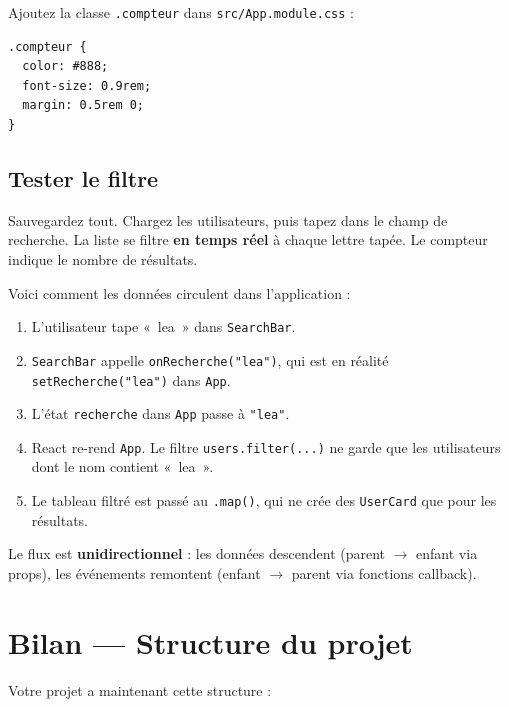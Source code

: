 \documentclass[11pt,a4paper]{article}
\begin{document}
Ajoutez la classe \texttt{.compteur} dans \texttt{src/App.module.css} :

\begin{lstlisting}[style=css]
.compteur {
  color: #888;
  font-size: 0.9rem;
  margin: 0.5rem 0;
}
\end{lstlisting}

\subsection{Tester le filtre}

Sauvegardez tout. Chargez les utilisateurs, puis tapez dans le champ de recherche. La liste se filtre \textbf{en temps réel} à chaque lettre tapée. Le compteur indique le nombre de résultats.

\begin{retenirbox}
Voici comment les données circulent dans l'application :

\begin{enumerate}[nosep]
    \item L'utilisateur tape «~lea~» dans \texttt{SearchBar}.
    \item \texttt{SearchBar} appelle \texttt{onRecherche("lea")}, qui est en réalité \texttt{setRecherche("lea")} dans \texttt{App}.
    \item L'état \texttt{recherche} dans \texttt{App} passe à \texttt{"lea"}.
    \item React re-rend \texttt{App}. Le filtre \texttt{users.filter(...)} ne garde que les utilisateurs dont le nom contient «~lea~».
    \item Le tableau filtré est passé au \texttt{.map()}, qui ne crée des \texttt{UserCard} que pour les résultats.
\end{enumerate}

Le flux est \textbf{unidirectionnel} : les données descendent (parent $\to$ enfant via props), les événements remontent (enfant $\to$ parent via fonctions callback).
\end{retenirbox}

\section{Bilan --- Structure du projet}
\label{sec:bilan}

Votre projet a maintenant cette structure :
\end{document}
